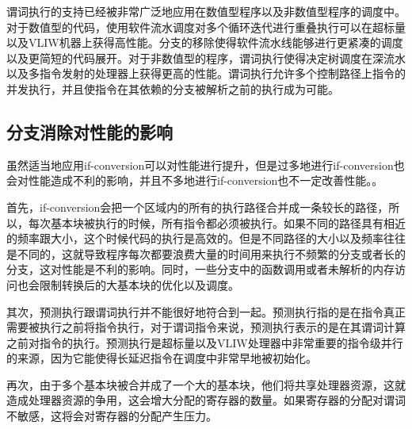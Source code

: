 谓词执行的支持已经被非常广泛地应用在数值型程序以及非数值型程序的调度中\cite{ScottA.Mahlke1992}。对于数值型的代码，使用软件流水调度对多个循环迭代进行重叠执行可以在超标量以及VLIW机器上获得高性能\cite{1989a}\cite{JosephP.Brutt}。分支的移除使得软件流水线能够进行更紧凑的调度以及更简短的代码展开。对于非数值型的程序，谓词执行使得决定树调度在深流水以及多指令发射的处理器上获得更高的性能\cite{Hsu1986}。谓词执行允许多个控制路径上指令的并发执行，并且使指令在其依赖的分支被解析之前的执行成为可能。

\subsection{分支消除对性能的影响}\label{ifcvt_harm_performance}

虽然适当地应用if-conversion可以对性能进行提升，但是过多地进行if-conversion也会对性能造成不利的影响，并且不多地进行if-conversion也不一定改善性能。\cite{ScottA.Mahlke1992}\cite{Tian2010}。

首先，if-conversion会把一个区域内的所有的执行路径合并成一条较长的路径，所以，每次基本块被执行的时候，所有指令都必须被执行。如果不同的路径具有相近的频率跟大小，这个时候代码的执行是高效的。但是不同路径的大小以及频率往往是不同的，这就导致程序每次都要浪费大量的时间用来执行不频繁的分支或者长的分支，这对性能是不利的影响。同时，一些分支中的函数调用或者未解析的内存访问也会限制转换后的大基本块的优化以及调度。

其次，预测执行跟谓词执行并不能很好地符合到一起。预测执行指的是在指令真正需要被执行之前将指令执行，对于谓词指令来说，预测执行表示的是在其谓词计算之前对指令的执行。预测执行是超标量以及VLIW处理器中非常重要的指令级并行的来源，因为它能使得长延迟指令在调度中非常早地被初始化。

再次，由于多个基本块被合并成了一个大的基本块，他们将共享处理器资源，这就造成处理器资源的争用，这会增大分配的寄存器的数量。如果寄存器的分配对谓词不敏感，这将会对寄存器的分配产生压力\cite{Quinones2006}\cite{Quinones2007}。